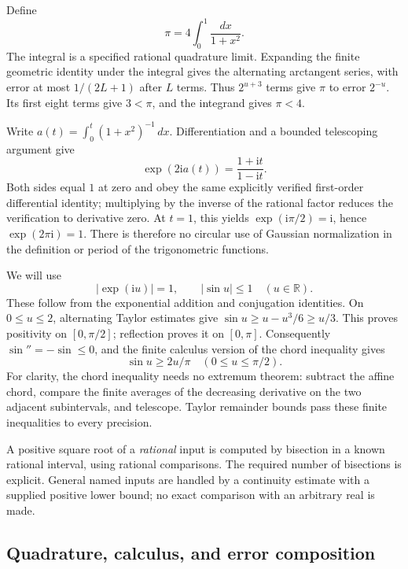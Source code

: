 \documentclass[11pt,letterpaper]{article}
\numberwithin{equation}{section}
\theoremstyle{definition}
\newcommand{\R}{\mathbb R}
\newcommand{\ii}{\mathrm i}
\begin{document}
Define
\begin{equation}
       \pi=4\int_0^1\frac{dx}{1+x^2}.                       \label{eq:pidef}
\end{equation}
The integral is a specified rational quadrature limit. Expanding the
finite geometric identity under the integral gives the alternating
arctangent series, with error at most \(1/(2L+1)\) after \(L\)
terms. Thus \(2^{u+3}\) terms give \(\pi\) to error \(2^{-u}\).
Its first eight terms give \(3<\pi\), and the integrand gives
\(\pi<4\).

Write \(a(t)=\int_0^t(1+x^2)^{-1}\,dx\).
Differentiation and a bounded telescoping argument give
\[
 \exp(2\ii a(t))=\frac{1+\ii t}{1-\ii t}.
\]
Both sides equal \(1\) at zero and obey the same explicitly verified
first-order differential identity; multiplying by the inverse of the
rational factor reduces the verification to derivative zero.
At \(t=1\), this yields \(\exp(\ii\pi/2)=\ii\), hence
\(\exp(2\pi\ii)=1\).
There is therefore no circular use of Gaussian normalization in the
definition or period of the trigonometric functions.

We will use
\[
 |\exp(\ii u)|=1,\qquad |\sin u|\le1 \quad(u\in\R).
\]
These follow from the exponential addition and conjugation identities.
On \(0\le u\le2\), alternating Taylor estimates give
\(\sin u\ge u-u^3/6\ge u/3\).
This proves positivity on \([0,\pi/2]\); reflection proves it on
\([0,\pi]\). Consequently \(\sin''=-\sin\le0\), and the finite
calculus version of the chord inequality gives
\begin{equation}
                  \sin u\ge 2u/\pi\quad(0\le u\le\pi/2).
                  \label{eq:sinchord}
\end{equation}
For clarity, the chord inequality needs no extremum theorem: subtract
the affine chord, compare the finite averages of the decreasing
derivative on the two adjacent subintervals, and telescope. Taylor
remainder bounds pass these finite inequalities to every precision.

A positive square root of a \emph{rational} input is computed by
bisection in a known rational interval, using rational comparisons.
The required number of bisections is explicit. General named inputs
are handled by a continuity estimate with a supplied positive lower
bound; no exact comparison with an arbitrary real is made.

\subsection{Quadrature, calculus, and error composition}
\end{document}

